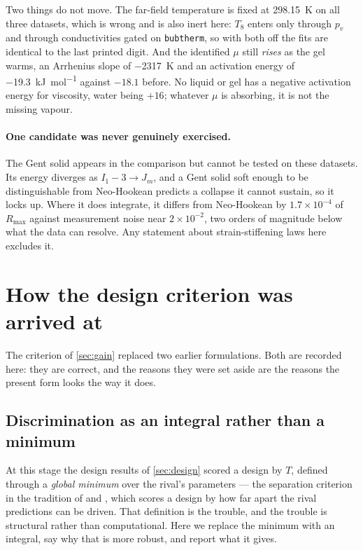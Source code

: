 \documentclass[10pt]{article}
\begin{document}
Two things do not move. The far-field temperature is fixed at \SI{298.15}{\kelvin} on all three
datasets, which is wrong and is also inert here: $T_8$ enters only through $p_v$ and through
conductivities gated on \texttt{bubtherm}, so with both off the fits are identical to the last
printed digit. And the identified $\mu$ still \emph{rises} as the gel warms, an Arrhenius slope
of \SI{-2317}{\kelvin} and an activation energy of \SI{-19.3}{\kilo\joule\per\mole} against
$-18.1$ before. No liquid or gel has a negative activation energy for viscosity, water being
$+16$; whatever $\mu$ is absorbing, it is not the missing vapour.

\paragraph{One candidate was never genuinely exercised.}
The Gent solid appears in the comparison but cannot be tested on these datasets. Its energy
diverges as $I_1 - 3 \to J_m$, and a Gent solid soft enough to be distinguishable from
Neo-Hookean predicts a collapse it cannot sustain, so it locks up. Where it does
integrate, it differs from Neo-Hookean by $1.7\times10^{-4}$ of $R_{\max}$ against
measurement noise near $2\times10^{-2}$, two orders of magnitude below what the data can
resolve. Any statement about strain-stiffening laws here excludes it.

\appendix


\section{How the design criterion was arrived at}
\label{sec:genealogy}

The criterion of \cref{sec:gain} replaced two earlier formulations. Both are
recorded here: they are correct, and the reasons they were set aside are the
reasons the present form looks the way it does.

\subsection*{Discrimination as an integral rather than a minimum}
\label{sec:integral}

At this stage the design results of \cref{sec:design} scored a design by $T$, defined through a
\emph{global minimum} over the rival's parameters --- the separation criterion in the tradition
of \citet{box1967discrimination} and \citet{buzziferraris1983sequential}, which scores a design
by how far apart the rival predictions can be driven. That definition is the trouble, and the
trouble is structural rather than computational. Here we replace the minimum with an integral, say why
that is more robust, and report what it gives.
\end{document}
